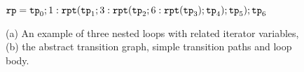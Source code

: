\begin{figure}
$\mathtt{rp} = \mathtt{tp}_0; 1: \mathtt{rpt}(\mathtt{tp}_1; 3: {\mathtt{rpt}(\mathtt{tp}_2; 6 : {\mathtt{rpt}(\mathtt{tp}_3)}; \mathtt{tp}_4)}; \mathtt{tp}_5);\mathtt{tp}_6$
\vspace{-0.2cm}
\caption{
    (a) An example of three nested loops with related iterator variables,
    (b) the abstract transition graph, simple transition paths and loop body.}
    \vspace{-0.8cm}
        \label{fig:threeWhile-overview}
    \end{figure}